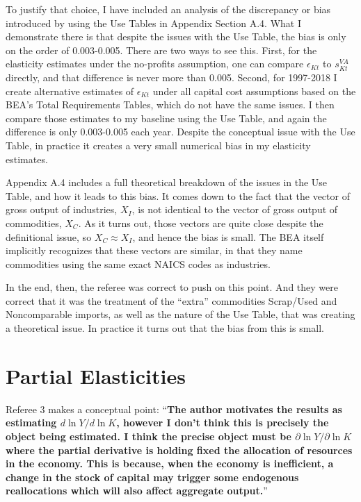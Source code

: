 \documentclass[11pt]{article}
\begin{document}
To justify that choice, I have included an analysis of the discrepancy or bias introduced by using the Use Tables in Appendix Section A.4. What I demonstrate there is that despite the issues with the Use Table, the bias is only on the order of 0.003-0.005. There are two ways to see this. First, for the elasticity estimates under the no-profits assumption, one can compare $\epsilon_{Kt}$ to $s_{Kt}^{VA}$ directly, and that difference is never more than 0.005. Second, for 1997-2018 I create alternative estimates of $\epsilon_{Kt}$ under all capital cost assumptions based on the BEA's Total Requirements Tables, which do not have the same issues. I then compare those estimates to my baseline using the Use Table, and again the difference is only 0.003-0.005 each year. Despite the conceptual issue with the Use Table, in practice it creates a very small numerical bias in my elasticity estimates. 

Appendix A.4 includes a full theoretical breakdown of the issues in the Use Table, and how it leads to this bias. It comes down to the fact that the vector of gross output of industries, $X_I$, is not identical to the vector of gross output of commodities, $X_C$. As it turns out, those vectors are quite close despite the definitional issue, so $X_C \approx X_I$, and hence the bias is small. The BEA itself implicitly recognizes that these vectors are similar, in that they name commodities using the same exact NAICS codes as industries. 

In the end, then, the referee was correct to push on this point. And they were correct that it was the treatment of the ``extra'' commodities Scrap/Used and Noncomparable imports, as well as the nature of the Use Table, that was creating a theoretical issue. In practice it turns out that the bias from this is small.

\section{Partial Elasticities}
Referee 3 makes a conceptual point: ``\textbf{The author motivates the results as estimating $d \ln Y/d \ln K$, however I don't think this is precisely the object being estimated. I think the precise object must be $\partial \ln Y/ \partial \ln K$ where the partial derivative is holding fixed the allocation of resources in the economy. This is because, when the economy is inefficient, a change in the stock of capital may trigger some endogenous reallocations which will also affect aggregate output.}''
\end{document}

